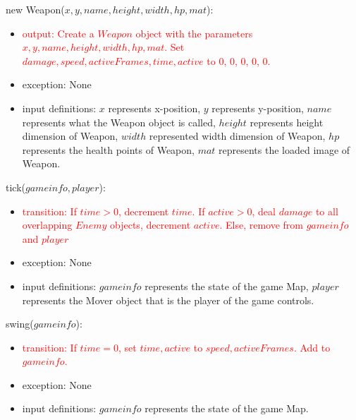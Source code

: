 \documentclass[12pt]{article}
\newcommand{\Implies}{\Rightarrow}
\newcommand{\m}[1]{\mbox{#1}}
\begin{document}
new Weapon($x, y, name, height, width, hp, mat$):
\begin{itemize}
    \item \textcolor{red}{output: Create a $Weapon$ object with the parameters $x, y, name, height, width, hp, mat$. Set $damage, speed, activeFrames, time, active$ to 0, 0, 0, 0, 0.}
    \item exception: None
    \item input definitions: $x$ represents x-position, $y$ represents y-position, $name$ represents what the Weapon object is called, $height$ represents height dimension of Weapon, $width$ represented width dimension of Weapon, $hp$ represents the health points of Weapon, $mat$ represents the loaded image of Weapon.
\end{itemize}

\noindent tick($gameinfo, player$):
\begin{itemize}
    \item \textcolor{red}{transition: If $time > 0$, decrement $time$. If $active > 0$, deal $damage$ to all overlapping $Enemy$ objects, decrement $active$. Else, remove from $gameinfo$ and $player$}
    \item exception: None
    \item input definitions: $gameinfo$ represents the state of the game Map, $player$ represents the Mover object that is the player of the game controls.
\end{itemize}

\noindent swing($gameinfo$):
\begin{itemize}
    \item \textcolor{red}{transition: If $time = 0$, set $time, active$ to $speed, activeFrames$. Add to $gameinfo$.}
    \item exception: None
    \item input definitions: $gameinfo$ represents the state of the game Map.
\end{itemize}
\end{document}
